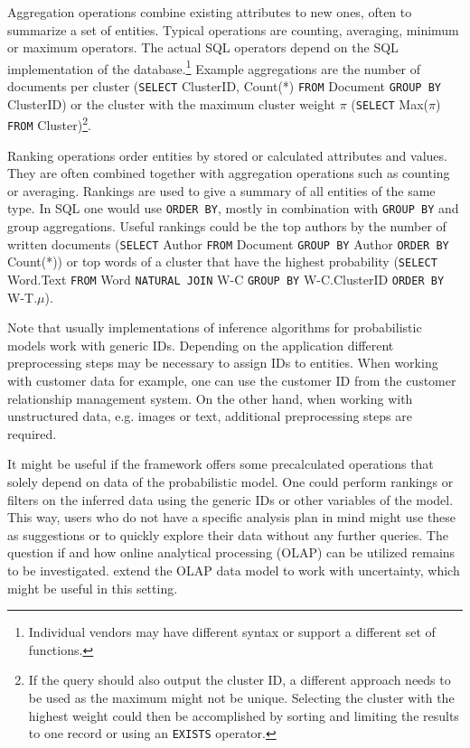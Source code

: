 Aggregation operations combine existing attributes to new ones, often to summarize a set of entities. Typical operations are counting, averaging, minimum or maximum operators. The actual SQL operators depend on the SQL implementation of the database.\footnote{Individual vendors may have different syntax or support a different set of functions.} Example aggregations are the number of documents per cluster (\texttt{SELECT} ClusterID, Count(*) \texttt{FROM} Document \texttt{GROUP BY} ClusterID) or the cluster with the maximum cluster weight $\pi$ (\texttt{SELECT} Max($\pi$) \texttt{FROM} Cluster)\footnote{If the query should also output the cluster ID, a different approach needs to be used as the maximum might not be unique. Selecting the cluster with the highest weight could then be accomplished by sorting and limiting the results to one record or using an \texttt{EXISTS} operator.}.

Ranking operations order entities by stored or calculated attributes and values. They are often combined together with aggregation operations such as counting or averaging. Rankings are used to give a summary of all entities of the same type. In SQL one would use \texttt{ORDER BY}, mostly in combination with \texttt{GROUP BY} and group aggregations. Useful rankings could be the top authors by the number of written documents (\texttt{SELECT} Author \texttt{FROM} Document \texttt{GROUP BY} Author \texttt{ORDER BY} Count(*)) or top words of a cluster that have the highest probability (\texttt{SELECT} Word.Text \texttt{FROM} Word \texttt{NATURAL JOIN} W-C \texttt{GROUP BY} W-C.ClusterID \texttt{ORDER BY} W-T.$\mu$).

Note that usually implementations of inference algorithms for probabilistic models work with generic IDs. Depending on the application different preprocessing steps may be necessary to assign IDs to entities. When working with customer data for example, one can use the customer ID from the customer relationship management system. On the other hand, when working with unstructured data, e.g. images or text, additional preprocessing steps are required.

It might be useful if the framework offers some precalculated operations that solely depend on data of the probabilistic model. One could perform rankings or filters on the inferred data using the generic IDs or other variables of the model. This way, users who do not have a specific analysis plan in mind might use these as suggestions or to quickly explore their data without any further queries. The question if and how online analytical processing (OLAP) can be utilized remains to be investigated. \textcite{burdick2007olap} extend the OLAP data model to work with uncertainty, which might be useful in this setting.

